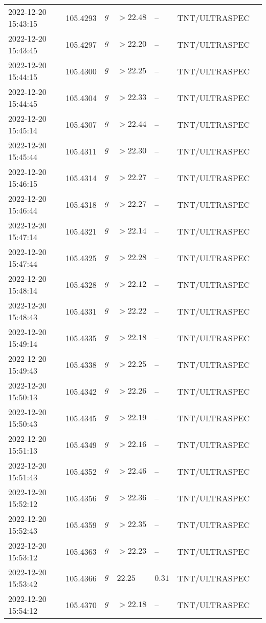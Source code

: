 \documentclass{nature_plusfigure}
\begin{document}
\begin{supplement}
\begin{center}
\begin{longtable}{lllllll}
2022-12-20 15:43:15 & 105.4293 & $g$ & $>22.48$ & -- & TNT/ULTRASPEC &  \\ 
2022-12-20 15:43:45 & 105.4297 & $g$ & $>22.20$ & -- & TNT/ULTRASPEC &  \\ 
2022-12-20 15:44:15 & 105.4300 & $g$ & $>22.25$ & -- & TNT/ULTRASPEC &  \\ 
2022-12-20 15:44:45 & 105.4304 & $g$ & $>22.33$ & -- & TNT/ULTRASPEC &  \\ 
2022-12-20 15:45:14 & 105.4307 & $g$ & $>22.44$ & -- & TNT/ULTRASPEC &  \\ 
2022-12-20 15:45:44 & 105.4311 & $g$ & $>22.30$ & -- & TNT/ULTRASPEC &  \\ 
2022-12-20 15:46:15 & 105.4314 & $g$ & $>22.27$ & -- & TNT/ULTRASPEC &  \\ 
2022-12-20 15:46:44 & 105.4318 & $g$ & $>22.27$ & -- & TNT/ULTRASPEC &  \\ 
2022-12-20 15:47:14 & 105.4321 & $g$ & $>22.14$ & -- & TNT/ULTRASPEC &  \\ 
2022-12-20 15:47:44 & 105.4325 & $g$ & $>22.28$ & -- & TNT/ULTRASPEC &  \\ 
2022-12-20 15:48:14 & 105.4328 & $g$ & $>22.12$ & -- & TNT/ULTRASPEC &  \\ 
2022-12-20 15:48:43 & 105.4331 & $g$ & $>22.22$ & -- & TNT/ULTRASPEC &  \\ 
2022-12-20 15:49:14 & 105.4335 & $g$ & $>22.18$ & -- & TNT/ULTRASPEC &  \\ 
2022-12-20 15:49:43 & 105.4338 & $g$ & $>22.25$ & -- & TNT/ULTRASPEC &  \\ 
2022-12-20 15:50:13 & 105.4342 & $g$ & $>22.26$ & -- & TNT/ULTRASPEC &  \\ 
2022-12-20 15:50:43 & 105.4345 & $g$ & $>22.19$ & -- & TNT/ULTRASPEC &  \\ 
2022-12-20 15:51:13 & 105.4349 & $g$ & $>22.16$ & -- & TNT/ULTRASPEC &  \\ 
2022-12-20 15:51:43 & 105.4352 & $g$ & $>22.46$ & -- & TNT/ULTRASPEC &  \\ 
2022-12-20 15:52:12 & 105.4356 & $g$ & $>22.36$ & -- & TNT/ULTRASPEC &  \\ 
2022-12-20 15:52:43 & 105.4359 & $g$ & $>22.35$ & -- & TNT/ULTRASPEC &  \\ 
2022-12-20 15:53:12 & 105.4363 & $g$ & $>22.23$ & -- & TNT/ULTRASPEC &  \\ 
2022-12-20 15:53:42 & 105.4366 & $g$ & $22.25$ & $0.31$ & TNT/ULTRASPEC &  \\ 
2022-12-20 15:54:12 & 105.4370 & $g$ & $>22.18$ & -- & TNT/ULTRASPEC &  \\ 

\end{longtable}
\end{center}
\end{supplement}
\end{document}
